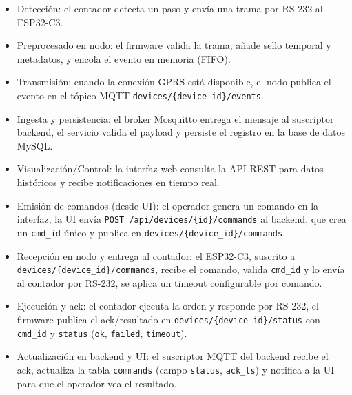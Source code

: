 \begin{itemize}

  \item Detección: el contador detecta un paso y envía una trama por RS-232 al ESP32-C3.

  \item Preprocesado en nodo: el firmware valida la trama, añade sello temporal y metadatos, y encola el evento en memoria (FIFO).

  \item Transmisión: cuando la conexión GPRS está disponible, el nodo publica el evento en el tópico MQTT \texttt{devices/\{device\_id\}/events}.
  
  \item Ingesta y persistencia: el broker Mosquitto entrega el mensaje al suscriptor backend, el servicio valida el payload y persiste el registro en la base de datos MySQL.
  
  \item Visualización/Control: la interfaz web consulta la API REST para datos históricos y recibe notificaciones en tiempo real.
  
  \item Emisión de comandos (desde UI): el operador genera un comando en la interfaz, la UI envía \texttt{POST /api/devices/\{id\}/commands} al backend, que crea un \texttt{cmd\_id} único y publica en \texttt{devices/\{device\_id\}/commands}.
  
  \item Recepción en nodo y entrega al contador: el ESP32-C3, suscrito a \texttt{devices/\{device\_id\}/commands}, recibe el comando, valida \texttt{cmd\_id} y lo envía al contador por RS-232, se aplica un timeout configurable por comando.
  
  \item Ejecución y ack: el contador ejecuta la orden y responde por RS-232, el firmware publica el ack/resultado en \texttt{devices/\{device\_id\}/status} con \texttt{cmd\_id} y \texttt{status} (\texttt{ok}, \texttt{failed}, \texttt{timeout}).

  \item Actualización en backend y UI: el suscriptor MQTT del backend recibe el ack, actualiza la tabla \texttt{commands} (campo \texttt{status}, \texttt{ack\_ts}) y notifica a la UI para que el operador vea el resultado.
\end{itemize}



